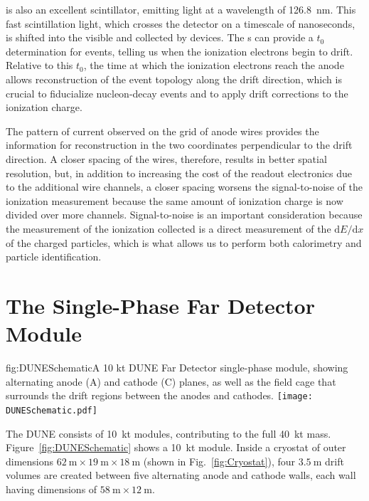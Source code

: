  is also an excellent scintillator, emitting  light at a wavelength of \SI{126.8}{\nano\meter}. This fast scintillation light, which crosses the detector on a timescale of nanoseconds, is shifted into the visible and collected by  devices. The s can provide a $t_{0}$ determination for events, telling us when the ionization electrons begin to drift. Relative to this $t_{0}$, the time at which the ionization electrons reach the anode allows reconstruction of the event topology along the drift direction, which is crucial to fiducialize nucleon-decay events and to apply drift corrections to the ionization charge.

The pattern of current observed on the grid of anode wires provides the information for reconstruction in the two coordinates perpendicular to the drift direction. A closer spacing of the wires, therefore, results in better spatial resolution, but, in addition to increasing the cost of the readout electronics due to the additional wire channels, a closer spacing worsens the signal-to-noise of the ionization measurement because the same amount of ionization charge is now divided over more channels. Signal-to-noise is an important consideration because the measurement of the ionization collected is a direct measurement of the $\mathrm{d}E/\mathrm{d}x$ of the charged particles, which is what allows us to perform both calorimetry and particle identification.

\section{The  Single-Phase Far Detector Module}
\label{sec:fdsp-exec-dunefd}

\begin{dunefigure}{fig:DUNESchematic}{A 10 kt DUNE Far Detector single-phase module, showing alternating anode (A) and cathode (C) planes, as well as the field cage that surrounds the drift regions between the anodes and cathodes.}
\texttt{[image: DUNESchematic.pdf]}
\end{dunefigure}

The DUNE   consists of \SI{10}{\kilo\tonne} modules, contributing to the full \SI{40}{\kilo\tonne}  mass. Figure~\ref{fig:DUNESchematic} shows a \SI{10}{\kilo\tonne} module. Inside a cryostat of outer dimensions $\SI{62}{\meter}\times \SI{19}{\meter}\times \SI{18}{\meter}$ (shown in Fig.~\ref{fig:Cryostat}), four $\SI{3.5}{\meter}$ drift volumes are created between five alternating anode and cathode walls, each wall having dimensions of $\SI{58}{\meter}\times \SI{12}{\meter}$.

